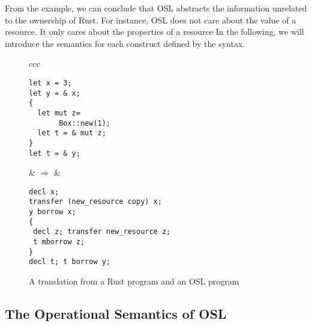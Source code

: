 \documentclass[runningheads]{llncs}
\begin{document}
From the example, we can conclude that OSL abstracts the information unrelated to the ownership of Rust.
For instance, OSL does not care about the value of a resource. It only cares about the properties of a resource 
In the following, we will introduce the semantics for each construct defined by the syntax.


\begin{figure}[h]
	\vspace{-0.5cm}
	\begin{center}
{\footnotesize
\begin{tabular}{ccc}
\begin{minipage}{0.33\textwidth}
		\renewcommand{\ttdefault}{pcr}
\begin{lstlisting}
let x = 3;
let y = & x;
{
  let mut z=
       Box::new(1);
  let t = & mut z;
}
let t = & y;
\end{lstlisting}
\end{minipage}

& \quad\quad  $\Rightarrow$ \quad\quad \quad& 
\begin{minipage}{0.4\textwidth}
		\renewcommand{\ttdefault}{pcr}
	\begin{lstlisting}
decl x; 
transfer (new_resource copy) x;
y borrow x; 
{
 decl z; transfer new_resource z;
 t mborrow z;
}
decl t; t borrow y;
	\end{lstlisting}
\end{minipage}
\end{tabular}}
	\end{center}
\vspace{-0.5cm}
\caption{A translation from a Rust program and an OSL program}
\label{fig:translation}
\vspace{-0.5cm}
\end{figure}

\subsection{The Operational Semantics of OSL}
\label{sec:semanticsosl}
\end{document}
